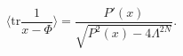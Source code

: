 \begin{equation}
\langle \mathrm{tr}\frac{1}{x-\Phi}\rangle = \frac{P'(x)}{\sqrt{P^2(x)-4\Lambda^{2N}}}.
\end{equation}

